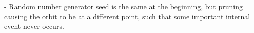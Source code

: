 - Random number generator seed is the same at the beginning, but pruning
causing the orbit to be at a different point, such that some important
internal event never occurs.
